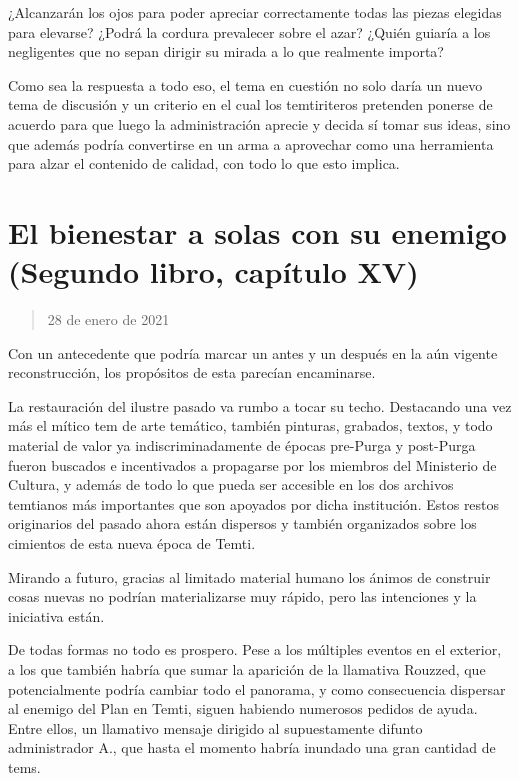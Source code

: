\documentclass[
]{book}
\begin{document}
¿Alcanzarán los ojos para poder apreciar correctamente todas las piezas elegidas para elevarse? ¿Podrá la cordura prevalecer sobre el azar? ¿Quién guiaría a los negligentes que no sepan dirigir su mirada a lo que realmente importa?

Como sea la respuesta a todo eso, el tema en cuestión no solo daría un nuevo tema de discusión y un criterio en el cual los temtiriteros pretenden ponerse de acuerdo para que luego la administración aprecie y decida sí tomar sus ideas, sino que además podría convertirse en un arma a aprovechar como una herramienta para alzar el contenido de calidad, con todo lo que esto implica.

\hypertarget{el-bienestar-a-solas-con-su-enemigo-segundo-libro-capuxedtulo-xv}{%
\section{El bienestar a solas con su enemigo (Segundo libro, capítulo XV)}\label{el-bienestar-a-solas-con-su-enemigo-segundo-libro-capuxedtulo-xv}}

\begin{quote}
28 de enero de 2021
\end{quote}

Con un antecedente que podría marcar un antes y un después en la aún vigente reconstrucción, los propósitos de esta parecían encaminarse.

La restauración del ilustre pasado va rumbo a tocar su techo. Destacando una vez más el mítico tem de arte temático, también pinturas, grabados, textos, y todo material de valor ya indiscriminadamente de épocas pre-Purga y post-Purga fueron buscados e incentivados a propagarse por los miembros del Ministerio de Cultura, y además de todo lo que pueda ser accesible en los dos archivos temtianos más importantes que son apoyados por dicha institución. Estos restos originarios del pasado ahora están dispersos y también organizados sobre los cimientos de esta nueva época de Temti.

Mirando a futuro, gracias al limitado material humano los ánimos de construir cosas nuevas no podrían materializarse muy rápido, pero las intenciones y la iniciativa están.

De todas formas no todo es prospero. Pese a los múltiples eventos en el exterior, a los que también habría que sumar la aparición de la llamativa Rouzzed, que potencialmente podría cambiar todo el panorama, y como consecuencia dispersar al enemigo del Plan en Temti, siguen habiendo numerosos pedidos de ayuda. Entre ellos, un llamativo mensaje dirigido al supuestamente difunto administrador A., que hasta el momento habría inundado una gran cantidad de tems.
\end{document}
